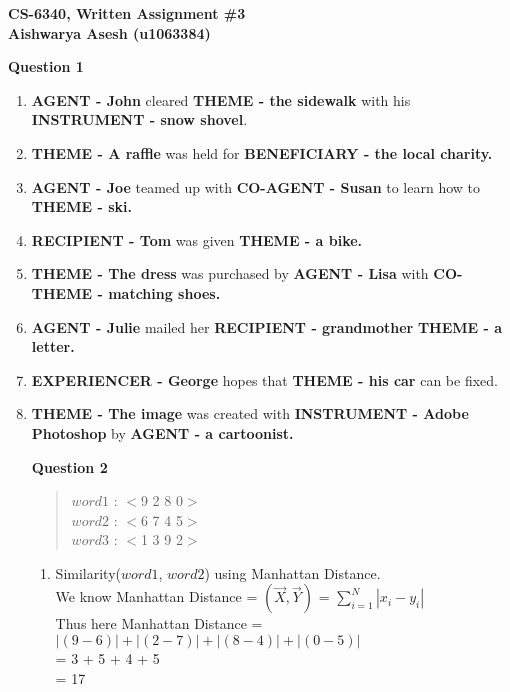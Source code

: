 \documentclass[11pt]{article}
\begin{document}
\large
\begin{center}
{\bf CS-6340, Written Assignment \#3} \\
{\bf Aishwarya Asesh (u1063384)}
\end{center}
\normalsize
{\bf Question 1}
\begin{enumerate}

\item {\bf AGENT - John} cleared {\bf THEME - the sidewalk} with his {\bf INSTRUMENT - snow shovel}. 

\item {\bf THEME - A raffle} was held for {\bf BENEFICIARY - the local charity.} 

\item {\bf AGENT - Joe} teamed up with {\bf CO-AGENT - Susan} to learn how to {\bf THEME - ski.} 

\item  {\bf RECIPIENT - Tom} was given {\bf THEME - a bike.} 

\item {\bf THEME - The dress} was purchased by {\bf AGENT - Lisa} with {\bf CO-THEME - matching shoes.} 

\item {\bf AGENT - Julie} mailed her {\bf RECIPIENT - grandmother} {\bf THEME - a letter.} 

\item {\bf EXPERIENCER - George} hopes that {\bf THEME - his car} can be fixed.

\item {\bf THEME - The image} was created with {\bf INSTRUMENT - Adobe Photoshop} by {\bf AGENT - a cartoonist.}

\newpage
{\bf Question 2}
\begin{quote}
\hspace*{.5in} $word1$ : $<$9 2 8 0$>$ \\
\hspace*{.5in} $word2$ : $<$6 7 4 5$>$  \\
\hspace*{.5in} $word3$ : $<$1 3 9 2$>$ 
\end{quote}

\begin{enumerate}


\item Similarity($word1$, $word2$) using Manhattan Distance.  \\ 

We know Manhattan Distance = $(\vec {X}, \vec {Y})$ = $\sum ^{N}_{i=1} |x_{i} - y_{i} |$\\
Thus here Manhattan Distance = $|(9-6)| + |(2-7)| + |(8-4)| + |(0-5)|$\\
= 3 + 5 + 4 + 5\\
= 17\\



\end{enumerate}
\end{enumerate}
\end{document}
